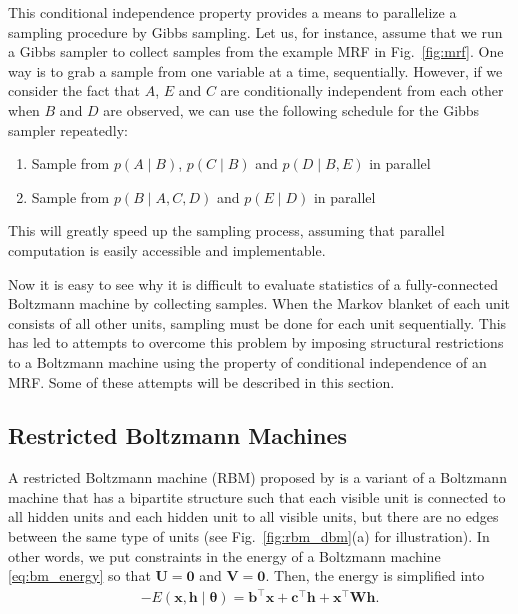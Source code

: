 \documentclass[dissertation,nocontribution,draft*]{aaltoseries}
\newcommand{\vect}[1]{\mathbf{#1}}
\newcommand{\vects}[1]{\boldsymbol{#1}}
\newcommand{\matr}[1]{\mathbf{#1}}
\newcommand{\vb}[0]{\vect{b}}
\newcommand{\vc}[0]{\vect{c}}
\newcommand{\vh}[0]{\vect{h}}
\newcommand{\vx}[0]{\vect{x}}
\newcommand{\mW}[0]{\matr{W}}
\newcommand{\mU}[0]{\matr{U}}
\newcommand{\mV}[0]{\matr{V}}
\newcommand{\mzero}[0]{\matr{0}}
\newcommand{\TT}[0]{{\vects{\theta}}}
\begin{document}
This conditional independence property provides a means to
parallelize a sampling procedure by Gibbs sampling. Let
us, for instance, assume that we run a Gibbs sampler to
collect samples from the example MRF in Fig.~\ref{fig:mrf}. One way is to grab a
sample from one variable at a time, sequentially. However,
if we consider the fact that $A$, $E$ and $C$ are
conditionally independent from each other when $B$ and $D$
are observed, we can use the following schedule for the
Gibbs sampler repeatedly:
\begin{enumerate}
    \itemsep 0em
    \item Sample from $p(A\mid B)$, $p(C \mid B)$ and $p(D
        \mid B, E)$ in parallel
    \item Sample from $p(B \mid A, C, D)$ and $p(E \mid D)$
        in parallel
\end{enumerate}
This will greatly speed up the sampling process, assuming
that parallel computation is easily accessible and
implementable.

Now it is easy to see why it is difficult to evaluate
statistics of a fully-connected Boltzmann machine by
collecting samples. When the Markov blanket of each unit
consists of all other units, sampling must be done for each
unit sequentially. This has led to attempts to overcome this
problem by imposing structural restrictions to a Boltzmann
machine using the property of conditional independence of an
MRF. Some of these attempts will be described in this section.

\subsection{Restricted Boltzmann Machines}
\label{sec:rbm}

A restricted Boltzmann machine (RBM) proposed by
\citet{Smolensky1986} is a variant of a Boltzmann machine
that has a bipartite structure such that each visible unit
is connected to all hidden units and each hidden unit to all
visible units, but there are no edges between the same type of units
(see Fig.~\ref{fig:rbm_dbm}(a) for illustration). In other
words, we put constraints in the energy of a Boltzmann
machine \eqref{eq:bm_energy} so that $\mU = \mzero$ and $\mV =
\mzero$.  Then, the energy is simplified into 
\begin{align}
    \label{eq:rbm_energy}
    -E(\vx, \vh \mid \TT) = \vb^\top \vx + \vc^\top \vh +
    \vx^\top \mW \vh.
\end{align}
\end{document}
